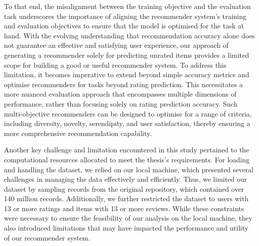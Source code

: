 To that end, the misalignment between the training objective and the evaluation task underscores the importance of aligning the recommender system's training and evaluation objectives to ensure that the model is optimised for the task at hand. With the evolving understanding that recommendation accuracy alone does not guarantee an effective and satisfying user experience, our approach of generating a recommender solely for predicting unrated items provides a limited scope for building a good or useful recommender system. To address this limitation, it becomes imperative to extend beyond simple accuracy metrics and optimise recommenders for tasks beyond rating prediction. This necessitates a more nuanced evaluation approach that encompasses multiple dimensions of performance, rather than focusing solely on rating prediction accuracy. Such multi-objective recommenders can be designed to optimise for a range of criteria, including diversity, novelty, serendipity, and user satisfaction, thereby ensuring a more comprehensive recommendation capability. 


Another key challenge and limitation encountered in this study pertained to the computational resources allocated to meet the thesis's requirements. For loading and handling the dataset, we relied on our local machine, which presented several challenges in managing the data effectively and efficiently. Thus, we limited our dataset by sampling records from the original repository, which contained over 140 million records. Additionally, we further restricted the dataset to users with 13 or more ratings and items with 13 or more reviews. While these constraints were necessary to ensure the feasibility of our analysis on the local machine, they also introduced limitations that may have impacted the performance and utility of our recommender system. 

